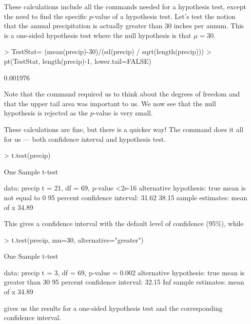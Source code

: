 These calculations include all the commands needed for a hypothesis test, except the need to find the specific $p$-value of a hypothesis test. Let's test the notion that the annual precipitation is actually greater than 30 inches per annum. This is a one-sided hypothesis test where the null hypothesis is that $\mu=30$.
\begin{Schunk}
\begin{Sinput}
> TestStat= (mean(precip)-30)/(sd(precip) / sqrt(length(precip)))
> pt(TestStat, length(precip)-1, lower.tail=FALSE)
\end{Sinput}
\begin{Soutput}
[1] 0.001976
\end{Soutput}
\end{Schunk}
 Note that the  command required us to think about the degrees of freedom and that the upper tail area was important to us. We now see that the null hypothesis is rejected as the $p$-value is very small.

These calculations are fine, but there is a quicker way! The  command does it all for us --- both confidence interval and hypothesis test.
\begin{Schunk}
\begin{Sinput}
> t.test(precip)
\end{Sinput}
\begin{Soutput}

	One Sample t-test

data:  precip
t = 21, df = 69, p-value <2e-16
alternative hypothesis: true mean is not equal to 0
95 percent confidence interval:
 31.62 38.15
sample estimates:
mean of x 
    34.89 
\end{Soutput}
\end{Schunk}
This gives a confidence interval with the default level of confidence (95\%), while
\begin{Schunk}
\begin{Sinput}
> t.test(precip, mu=30, alternative="greater")
\end{Sinput}
\begin{Soutput}

	One Sample t-test

data:  precip
t = 3, df = 69, p-value = 0.002
alternative hypothesis: true mean is greater than 30
95 percent confidence interval:
 32.15   Inf
sample estimates:
mean of x 
    34.89 
\end{Soutput}
\end{Schunk}
gives us the results for a one-sided hypothesis test and the corresponding confidence interval.


